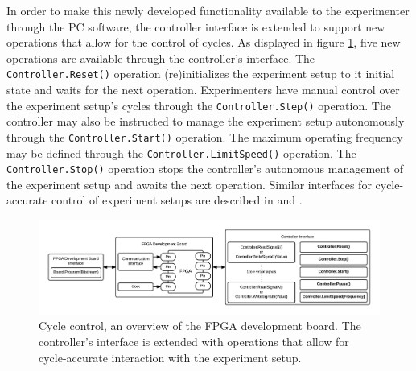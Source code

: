 \documentclass[openright]{template/uva-bachelor-thesis}
\begin{document}
In order to make this newly developed functionality available to the experimenter through the PC software, the controller interface is extended to support new operations that allow for the control of cycles. As displayed in figure \ref{fig:overview-control}, five new operations are available through the controller's interface. The \texttt{Controller.Reset()} operation (re)initializes the experiment setup to it initial state and waits for the next operation. Experimenters have manual control over the experiment setup's cycles through the \texttt{Controller.Step()} operation. The controller may also be instructed to manage the experiment setup autonomously through the \texttt{Controller.Start()} operation. The maximum operating frequency may be defined through the \texttt{Controller.LimitSpeed()} operation. The \texttt{Controller.Stop()} operation stops the controller's autonomous management of the experiment setup and awaits the next operation. Similar interfaces for cycle-accurate control of experiment setups are described in \cite{holland2003harnessing} and \cite{bulic2013fpga}.

\begin{figure}[h!]
\centering
\includegraphics[width=\textwidth]{img/overview-control}
\caption{Cycle control, an overview of the FPGA development board. The controller's interface is extended with operations that allow for cycle-accurate interaction with the experiment setup.}
\label{fig:overview-control}
\end{figure}



\end{document}
